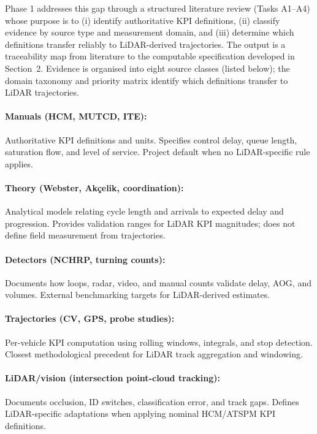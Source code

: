 \documentclass[11pt]{article}
\begin{document}
Phase 1 addresses this gap through a structured literature review (Tasks A1--A4) whose purpose is to (i) identify authoritative KPI definitions, (ii) classify evidence by source type and measurement domain, and (iii) determine which definitions transfer reliably to LiDAR-derived trajectories. The output is a traceability map from literature to the computable specification developed in Section~2. Evidence is organised into eight source classes (listed below); the domain taxonomy and priority matrix identify which definitions transfer to LiDAR trajectories.

\paragraph{Manuals (HCM, MUTCD, ITE):} Authoritative KPI definitions and units. Specifies control delay, queue length, saturation flow, and level of service. Project default when no LiDAR-specific rule applies.

\paragraph{Theory (Webster, Ak\c{c}elik, coordination):} Analytical models relating cycle length and arrivals to expected delay and progression. Provides validation ranges for LiDAR KPI magnitudes; does not define field measurement from trajectories.

\paragraph{Detectors (NCHRP, turning counts):} Documents how loops, radar, video, and manual counts validate delay, AOG, and volumes. External benchmarking targets for LiDAR-derived estimates.

\paragraph{Trajectories (CV, GPS, probe studies):} Per-vehicle KPI computation using rolling windows, integrals, and stop detection. Closest methodological precedent for LiDAR track aggregation and windowing.

\paragraph{LiDAR/vision (intersection point-cloud tracking):} Documents occlusion, ID switches, classification error, and track gaps. Defines LiDAR-specific adaptations when applying nominal HCM/ATSPM KPI definitions.
\end{document}
